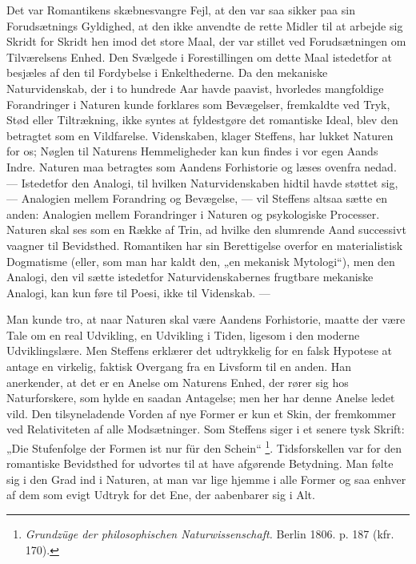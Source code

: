 \documentclass[12pt,a4paper,openany]{book}
\newcommand{\opage}[1]{\marginnote{\footnotesize\textit{[#1]}}}
\begin{document}
Det var Romantikens skæbnesvangre Fejl, at den var saa sikker paa sin
Forudsætnings Gyldighed, at den ikke anvendte de rette Midler til at arbejde
sig Skridt for Skridt hen imod det store Maal, der var stillet ved
Forudsætningen om Tilværelsens Enhed. Den Svælgede i Forestillingen om dette
Maal istedetfor at besjæles af den til Fordybelse i Enkelthederne. Da den
mekaniske Naturvidenskab, der i to hundrede Aar havde paavist, hvorledes
mangfoldige Forandringer i Naturen kunde forklares som Bevægelser, fremkaldte
ved Tryk, Stød eller Tiltrækning, ikke syntes at fyldestgøre det romantiske
Ideal, blev den betragtet som en Vildfarelse.
\setcounter{footnote}{0}%
\opage{45}Videnskaben, klager Steffens, har lukket Naturen for os; Nøglen til
Naturens Hemmeligheder kan kun findes i vor egen Aands Indre. Naturen maa
betragtes som Aandens Forhistorie og læses ovenfra nedad. --- Istedetfor den
Analogi, til hvilken Naturvidenskaben hidtil havde støttet sig, --- Analogien
mellem Forandring og Bevægelse, --- vil Steffens altsaa sætte en anden:
Analogien mellem Forandringer i Naturen og psykologiske Processer. Naturen skal
ses som en Række af Trin, ad hvilke den slumrende Aand successivt vaagner til
Bevidsthed. Romantiken har sin Berettigelse overfor en materialistisk
Dogmatisme (eller, som man har kaldt den, „en mekanisk Mytologi“), men den
Analogi, den vil sætte istedetfor Naturvidenskabernes frugtbare mekaniske
Analogi, kan kun føre til Poesi, ikke til Videnskab. ---

Man kunde tro, at naar Naturen skal være Aandens Forhistorie, maatte der være
Tale om en real Udvikling, en Udvikling i Tiden, ligesom i den moderne
Udviklingslære. Men Steffens erklærer det udtrykkelig for en falsk Hypotese at
antage en virkelig, faktisk Overgang fra en Livsform til en anden. Han
anerkender, at det er en Anelse om Naturens Enhed, der rører sig hos
Naturforskere, som hylde en saadan Antagelse; men her har denne Anelse ledet
vild. Den tilsyneladende Vorden af nye Former er kun et Skin, der fremkommer
ved Relativiteten af alle Modsætninger. Som Steffens siger i et senere tysk
Skrift: „Die Stufenfolge der Formen ist nur für den Schein“%
\footnote[1]{\textit{Grundzüge der philosophischen Naturwissenschaft.} Berlin
1806. p. 187 (kfr. 170).}. Tidsforskellen var for den romantiske Bevidsthed for
udvortes til at have afgørende Betydning. Man følte sig i den Grad ind i
Naturen, at man var lige hjemme i alle Former og saa enhver af dem som evigt
Udtryk for det Ene, der aabenbarer sig i Alt.
\end{document}
